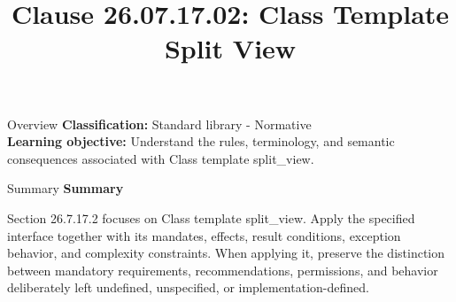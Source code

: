 \documentclass[10pt,letterpaper]{article}
\title{Clause 26.07.17.02: Class Template Split View}
\author{}
\date{}
\begin{document}
\maketitle
\begin{CornellOverviewBox}{Overview}
\textbf{Classification:} Standard library - Normative\\[2pt]
\textbf{Learning objective:} Understand the rules, terminology, and semantic consequences associated with Class template split\_view.
\end{CornellOverviewBox}\begin{CornellSummaryBox}{Summary}
{\sffamily\bfseries\color{Accent} Summary}\par\vspace{3pt}Section 26.7.17.2 focuses on Class template split\_view. Apply the specified interface together with its mandates, effects, result conditions, exception behavior, and complexity constraints. When applying it, preserve the distinction between mandatory requirements, recommendations, permissions, and behavior deliberately left undefined, unspecified, or implementation-defined.
\end{CornellSummaryBox}
\end{document}
